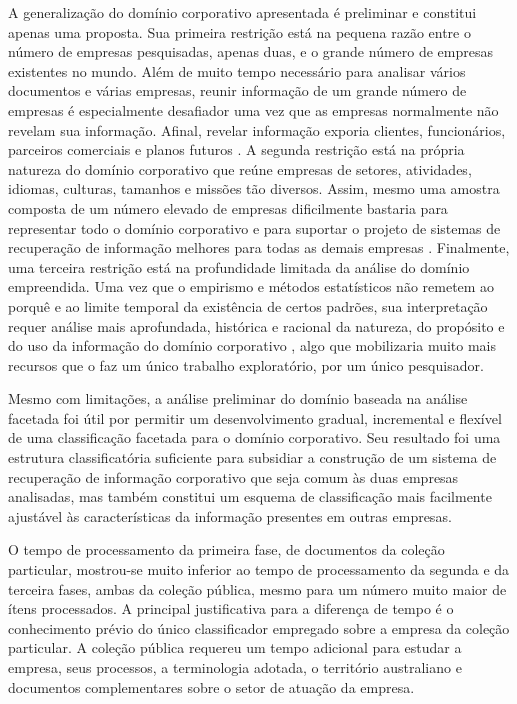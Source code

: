 A generalização do domínio corporativo apresentada é preliminar e constitui apenas uma proposta. Sua primeira restrição está na pequena razão entre o número de empresas pesquisadas, apenas duas, e o grande número de empresas existentes no mundo. Além de muito tempo necessário para analisar vários documentos e várias empresas, reunir informação de um grande número de empresas é especialmente desafiador uma vez que as empresas normalmente não revelam sua informação. Afinal, revelar informação exporia clientes, funcionários, parceiros comerciais e planos futuros \cite{bailey07csiro}. A segunda restrição está na própria natureza do domínio corporativo que reúne empresas de setores, atividades, idiomas, culturas, tamanhos e missões tão diversos. Assim, mesmo uma amostra composta de um número elevado de empresas dificilmente bastaria para representar todo o domínio corporativo e para suportar o projeto de sistemas de recuperação de informação melhores para todas as demais empresas \cite{halevy2005enterprise}. Finalmente, uma terceira restrição está na profundidade limitada da análise do domínio empreendida. Uma vez que o empirismo e métodos estatísticos não remetem ao porquê e ao limite temporal da existência de certos padrões, sua interpretação requer análise mais aprofundada, histórica e racional da natureza, do propósito e do uso da informação do domínio corporativo \cite{hjorland2002domain}, algo que mobilizaria muito mais recursos que o faz um único trabalho exploratório, por um único pesquisador.

Mesmo com limitações, a análise preliminar do domínio baseada na análise facetada foi útil por permitir um desenvolvimento gradual, incremental e flexível de uma classificação facetada para o domínio corporativo. Seu resultado foi uma estrutura classificatória suficiente para subsidiar a construção de um sistema de recuperação de informação corporativo que seja comum às duas empresas analisadas, mas também constitui um esquema de classificação mais facilmente ajustável às características da informação presentes em outras empresas.

O tempo de processamento da primeira fase, de documentos da coleção particular, mostrou-se muito inferior ao tempo de processamento da segunda e da terceira fases, ambas da coleção pública, mesmo para um número muito maior de ítens processados. A principal justificativa para a diferença de tempo é o conhecimento prévio do único classificador empregado sobre a empresa da coleção particular. A coleção pública requereu um tempo adicional para estudar a empresa, seus processos, a terminologia adotada, o território australiano e documentos complementares sobre o setor de atuação da empresa.

